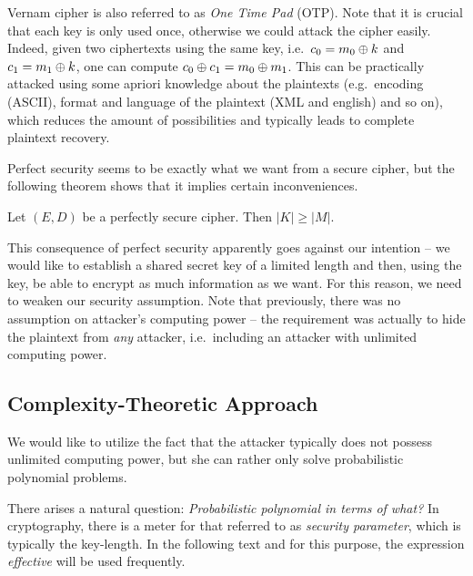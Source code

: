 \begin{note}
	Vernam cipher is also referred to as {\em One Time Pad} (OTP). Note that it is crucial that each key is only used once, otherwise we could attack the cipher easily. Indeed, given two ciphertexts using the same key, i.e.\ $c_0=m_0\oplus k$ and $c_1=m_1\oplus k$, one can compute $c_0\oplus c_1 = m_0\oplus m_1$. This can be practically attacked using some apriori knowledge about the plaintexts (e.g.\ encoding (ASCII), format and language of the plaintext (XML and english) and so on), which reduces the amount of possibilities and typically leads to complete plaintext recovery.
\end{note}

Perfect security seems to be exactly what we want from a secure cipher, but the following theorem shows that it implies certain inconveniences.

\begin{thm}
\label{thm:kgeqm}
	Let $(E,D)$ be a perfectly secure cipher. Then $|K| \geq |M|$.
\end{thm}

\begin{note}
\label{note:intent}
	This consequence of perfect security apparently goes against our intention -- we would like to establish a shared secret key of a limited length and then, using the key, be able to encrypt as much information as we want. For this reason, we need to weaken our security assumption. Note that previously, there was no assumption on attacker's computing power -- the requirement was actually to hide the  plaintext from {\em any} attacker, i.e.\ including an attacker with unlimited computing power.
\end{note}



\subsection{Complexity-Theoretic Approach}

We would like to utilize the fact that the attacker typically does not possess unlimited computing power, but she can rather only solve probabilistic polynomial problems.

\begin{note}
\label{note:polyinterms}
	There arises a natural question: {\em Probabilistic polynomial in terms of what?} In cryptography, there is a meter for that referred to as {\em security parameter}, which is typically the key-length. In the following text and for this purpose, the expression {\em effective} will be used frequently.
\end{note}

